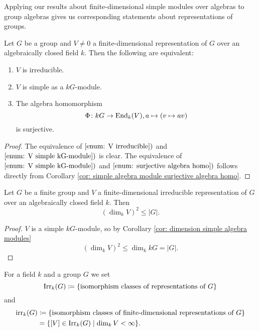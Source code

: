Applying our results about finite-dimensional simple modules over algebras to group algebras gives us corresponding statements about representations of groups.


\begin{lem}\label{lem: equivalence to irreducible}
 Let $G$ be a group and $V \neq 0$ a finite-dimensional representation of $G$ over an algebraically closed field $k$. Then the following are equivalent:
 \begin{enumerate}[label=\emph{\roman*})]
  \item\label{enum: V irreducible}
   $V$ is irreducible.
  \item\label{enum: V simple kG-module}
   $V$ is simple as a $kG$-module.
  \item\label{enum: surjective algebra homo}
   The algebra homomorphism
   \[
    \Phi \colon kG \to \operatorname{End}_k(V), a \mapsto (v \mapsto av)
   \]
   is surjective.
 \end{enumerate}
\end{lem}
\begin{proof}
 The equivalence of $\ref{enum: V irreducible})$ and $\ref{enum: V simple kG-module})$ is clear. The equivalence of $\ref{enum: V simple kG-module})$ and $\ref{enum: surjective algebra homo})$ follows directly from Corollary \ref{cor: simple algebra module surjective algebra homo}.
\end{proof}


\begin{cor}
 Let $G$ be a finite group and $V$ a finite-dimensional irreducible representation of $G$ over an algebraically closed field $k$. Then
 \[
  \left( \dim_k V \right)^2 \leq |G|.
 \]
\end{cor}
\begin{proof}
 $V$ is a simple $kG$-module, so by Corollary \ref{cor: dimension simple algebra modules}
 \[
  (\dim_k V)^2 \leq \dim_k kG = |G|.
 \]
\end{proof}


\begin{defi}
 For a field $k$ and a group $G$ we set
 \[
  \operatorname{Irr}_k(G) \coloneqq \{\text{isomorphism classes of representations of $G$}\}
 \]
 and
 \begin{align*}
  \operatorname{irr}_k(G)
  &\coloneqq \{\text{isomorphism classes of finite-dimensional representations of $G$}\} \\
  &= \{[V] \in \operatorname{Irr}_k(G) \mid \dim_k V < \infty\}.
 \end{align*}
\end{defi}


